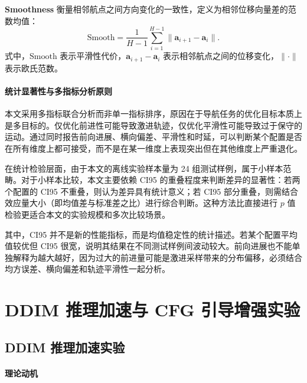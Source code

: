 \textbf{Smoothness} 衡量相邻航点之间方向变化的一致性，定义为相邻位移向量差的范数均值：
\begin{equation}
\text{Smooth} = \frac{1}{H-1} \sum_{i=1}^{H-1} \|\mathbf{a}_{i+1} - \mathbf{a}_i\|.
\end{equation}
式中，$\text{Smooth}$ 表示平滑性代价，$\mathbf{a}_{i+1}-\mathbf{a}_i$ 表示相邻航点之间的位移变化，$\|\cdot\|$ 表示欧氏范数。

\paragraph*{统计显著性与多指标分析原则}

本文采用多指标联合分析而非单一指标排序，原因在于导航任务的优化目标本质上是多目标的。仅优化前进性可能导致激进轨迹，仅优化平滑性可能导致过于保守的运动。通过同时报告前向进展、横向偏差、平滑性和时延，可以判断某个配置是否在所有维度上都可接受，而不是在某一维度上表现突出但在其他维度上严重退化。

在统计检验层面，由于本文的离线实验样本量为 24 组测试样例，属于小样本范畴。对于小样本比较，本文主要依赖 CI95 的重叠程度来判断差异的显著性：若两个配置的 CI95 不重叠，则认为差异具有统计意义；若 CI95 部分重叠，则需结合效应量大小（即均值差与标准差之比）进行综合判断。这种方法比直接进行 $p$ 值检验更适合本文的实验规模和多次比较场景。

其中，CI95 并不是新的性能指标，而是均值稳定性的统计描述。若某个配置平均值较优但 CI95 很宽，说明其结果在不同测试样例间波动较大。前向进展也不能单独解释为越大越好，因为过大的前进量可能是激进采样带来的分布偏移，必须结合均方误差、横向偏差和轨迹平滑性一起分析。

\section{DDIM 推理加速与 CFG 引导增强实验}

\subsection{DDIM 推理加速实验}

\paragraph*{理论动机}

